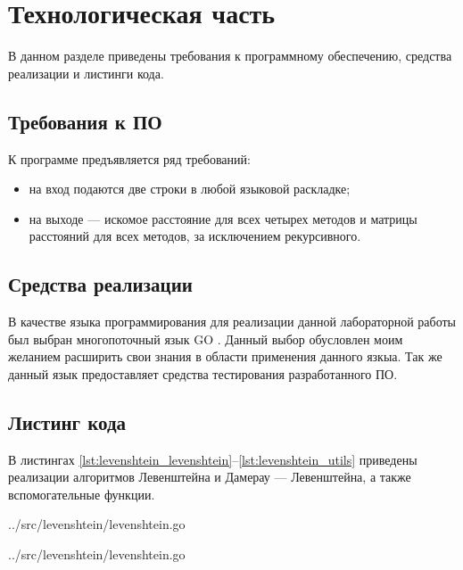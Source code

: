 \chapter{Технологическая часть}

В данном разделе приведены требования к программному обеспечению, средства реализации и листинги кода.

\section{Требования к ПО}

К программе предъявляется ряд требований:
\begin{itemize}
	\item на вход подаются две строки в любой языковой раскладке;
	\item на выходе — искомое расстояние для всех четырех методов и матрицы расстояний для всех методов, за исключением рекурсивного.
\end{itemize}

\section{Средства реализации}

В качестве языка программирования для реализации данной лабораторной работы был выбран многопоточный язык GO \cite{golang}. Данный выбор обусловлен моим желанием расширить свои знания в области применения данного язкыа. Так же данный язык предоставляет средства тестирования разработанного ПО.

\section{Листинг кода}

В листингах \ref{lst:levenshtein_levenshtein}--\ref{lst:levenshtein_utils} приведены реализации алгоритмов Левенштейна и Дамерау — Левенштейна, а также вспомогательные функции.

\begin{lstinputlisting}[
	caption={Рекурсивный},
	label={lst:levenshtein_rec},
	style={go},
	linerange={3-15},
	]{../src/levenshtein/levenshtein.go}
\end{lstinputlisting}

\begin{lstinputlisting}[
	caption={Матричный},
	label={lst:levenshtein_mtr},
	style={go},
	linerange={17-42},
	]{../src/levenshtein/levenshtein.go}
\end{lstinputlisting}

